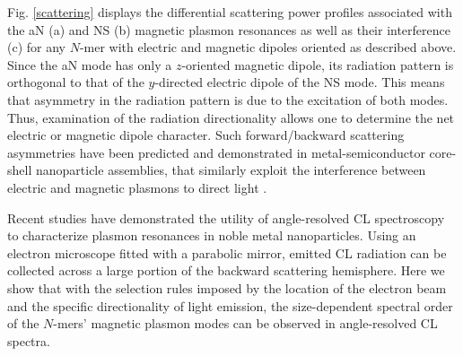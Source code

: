 \documentclass[journal=apchd5,manuscript=article]{achemso}
\begin{document}
Fig. \ref{scattering} displays the differential scattering power profiles associated with the aN (a) and NS (b) magnetic plasmon resonances as well as their interference (c) for any $N$-mer with electric and magnetic dipoles oriented as described above. Since the aN mode has only a $z$-oriented magnetic dipole, its radiation pattern is orthogonal to that of the $y$-directed electric dipole of the NS mode. This means that asymmetry in the radiation pattern is due to the excitation of both modes. Thus, examination of the radiation directionality allows one to determine the net electric or magnetic dipole character. Such forward/backward scattering asymmetries have been predicted and demonstrated in metal-semiconductor core-shell nanoparticle assemblies, that similarly exploit the interference between electric and magnetic plasmons to direct light \cite{Kivshar2012}.


Recent studies have demonstrated the utility of angle-resolved CL spectroscopy to characterize plasmon resonances in noble metal nanoparticles\cite{Coenen2011,CoPol2011,Polman2014}. Using an electron microscope fitted with a parabolic mirror, emitted CL radiation can be collected across a large portion of the backward scattering hemisphere\cite{Coenen2011,CoPol2011,Polman2014}. Here we show that with the selection rules imposed by the location of the electron beam and the specific directionality of light emission, the size-dependent spectral order of the $N$-mers' magnetic plasmon modes can be observed in angle-resolved CL spectra. 


\end{document}
